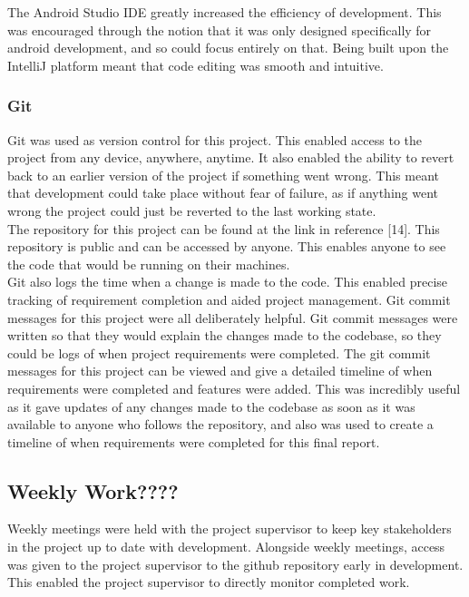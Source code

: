 \documentclass{article}
\begin{document}
The Android Studio IDE greatly increased the efficiency of development. This was encouraged through the notion that it was only designed specifically for android development, and so could focus entirely on that. Being built upon the IntelliJ platform meant that code editing was smooth and intuitive. \\

\subsubsection{Git}

Git was used as version control for this project. This enabled access to the project from any device, anywhere, anytime. It also enabled the ability to revert back to an earlier version of the project if something went wrong. This meant that development could take place without fear of failure, as if anything went wrong the project could just be reverted to the last working state.\\

The repository for this project can be found at the link in reference [14]. This repository is public and can be accessed by anyone. This enables anyone to see the code that would be running on their machines.\\

Git also logs the time when a change is made to the code. This enabled precise tracking of requirement completion and aided project management. Git commit messages for this project were all deliberately helpful. Git commit messages were written so that they would explain the changes made to the codebase, so they could be logs of when project requirements were completed. The git commit messages for this project can be viewed and give a detailed timeline of when requirements were completed and features were added. This was incredibly useful as it gave updates of any changes made to the codebase as soon as it was available to anyone who follows the repository, and also was used to create a timeline of when requirements were completed for this final report. \\

\subsection{Weekly Work????}

Weekly meetings were held with the project supervisor to keep key stakeholders in the project up to date with development. Alongside weekly meetings, access was given to the project supervisor to the  github repository early in development. This enabled the project supervisor to directly monitor completed work. \\
\end{document}
